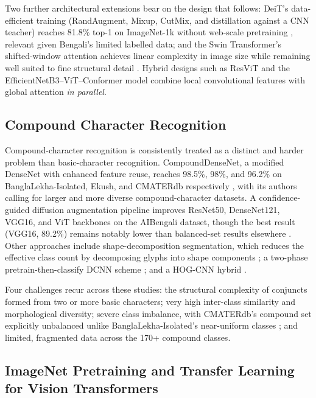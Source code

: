Two further architectural extensions bear on the design that follows:
DeiT's data-efficient training (RandAugment, Mixup, CutMix, and
distillation against a CNN teacher) reaches 81.8\% top-1 on ImageNet-1k
without web-scale pretraining \citep{ref41}, relevant given Bengali's
limited labelled data; and the Swin Transformer's shifted-window
attention achieves linear complexity in image size while remaining well
suited to fine structural detail \citep{ref42}. Hybrid designs such as
ResViT \citep{ref19} and the EfficientNetB3--ViT--Conformer model
\citep{ref25} combine local convolutional features with global attention
\emph{in parallel}.

\hypertarget{compound-character-recognition}{%
\subsection{Compound Character
Recognition}\label{compound-character-recognition}}

Compound-character recognition is consistently treated as a distinct
and harder problem than basic-character recognition. CompoundDenseNet,
a modified DenseNet with enhanced feature reuse, reaches 98.5\%, 98\%,
and 96.2\% on BanglaLekha-Isolated, Ekush, and CMATERdb respectively
\citep{ref23}, with its authors calling for larger and more diverse
compound-character datasets. A confidence-guided diffusion augmentation
pipeline improves ResNet50, DenseNet121, VGG16, and ViT backbones on the
AIBengali dataset, though the best result (VGG16, 89.2\%) remains notably
lower than balanced-set results elsewhere \citep{ref24}. Other
approaches include shape-decomposition segmentation, which reduces the
effective class count by decomposing glyphs into shape components
\citep{ref43}; a two-phase pretrain-then-classify DCNN scheme
\citep{ref35}; and a HOG-CNN hybrid \citep{ref44}.

Four challenges recur across these studies: the structural complexity
of conjuncts formed from two or more basic characters; very high
inter-class similarity and morphological diversity; severe class
imbalance, with CMATERdb's compound set explicitly unbalanced unlike
BanglaLekha-Isolated's near-uniform classes \citep{ref27}; and limited,
fragmented data across the 170+ compound classes.

\hypertarget{imagenet-pretraining-and-transfer-learning-for-vision-transformers}{%
\subsection{ImageNet Pretraining and Transfer Learning for Vision
Transformers}\label{imagenet-pretraining-and-transfer-learning-for-vision-transformers}}

